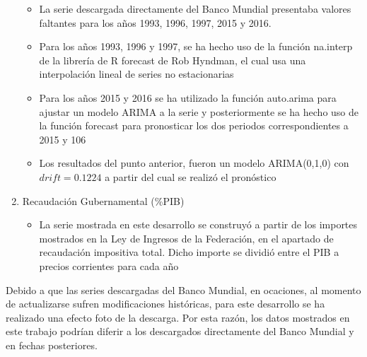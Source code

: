 \begin{enumerate}
\begin{itemize}
				\item La serie descargada directamente del Banco Mundial presentaba valores faltantes para los años 1993, 1996, 1997, 2015 y 2016. 
				\item Para los años 1993, 1996 y 1997, se ha hecho uso de la función na.interp de la librería de R forecast de Rob Hyndman, el cual usa una interpolación lineal de series no estacionarias
				\item Para los años 2015 y 2016 se ha utilizado la función auto.arima para ajustar un modelo ARIMA a la serie y posteriormente se ha hecho uso de la función forecast para pronosticar los dos periodos 							correspondientes a 2015 y 106
				\item Los resultados del punto anterior, fueron un modelo ARIMA(0,1,0) con $drift=0.1224$ a partir del cual se realizó el pronóstico
			\end{itemize}
	\item Recaudación Gubernamental (\%PIB)
	\begin{itemize}
				\item  La serie mostrada en este desarrollo se construyó a partir de los importes mostrados en la Ley de Ingresos de la Federación, en el apartado de recaudación impositiva total. Dicho importe se dividió entre el PIB a precios corrientes para cada año
			\end{itemize}			
\end{enumerate}


Debido a que las series descargadas del Banco Mundial, en ocaciones, al momento de actualizarse sufren modificaciones históricas, para este desarrollo se ha realizado una efecto foto de la descarga. Por esta razón, los datos mostrados en este trabajo podrían diferir a los descargados directamente del Banco Mundial y en fechas posteriores.